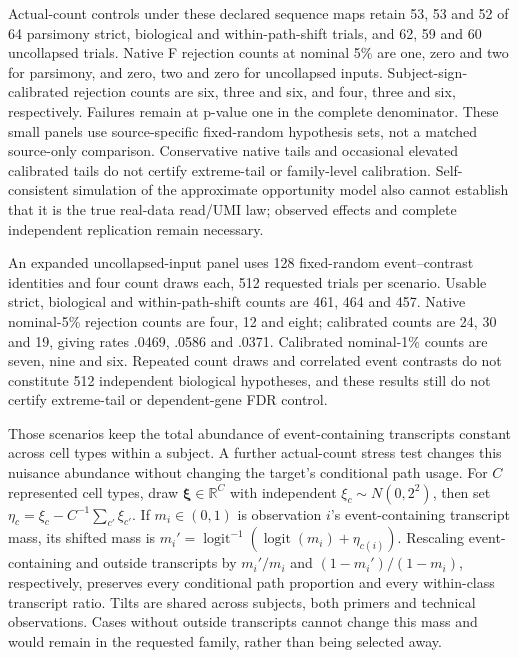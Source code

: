 \documentclass[11pt]{article}
\begin{document}
Actual-count controls under these declared sequence maps retain 53, 53 and 52 of 64 parsimony strict, biological and within-path-shift trials, and 62, 59 and 60 uncollapsed trials. Native F rejection counts at nominal 5\% are one, zero and two for parsimony, and zero, two and zero for uncollapsed inputs. Subject-sign-calibrated rejection counts are six, three and six, and four, three and six, respectively. Failures remain at p-value one in the complete denominator. These small panels use source-specific fixed-random hypothesis sets, not a matched source-only comparison. Conservative native tails and occasional elevated calibrated tails do not certify extreme-tail or family-level calibration. Self-consistent simulation of the approximate opportunity model also cannot establish that it is the true real-data read/UMI law; observed effects and complete independent replication remain necessary.

An expanded uncollapsed-input panel uses 128 fixed-random event--contrast identities and four count draws each, 512 requested trials per scenario. Usable strict, biological and within-path-shift counts are 461, 464 and 457. Native nominal-5\% rejection counts are four, 12 and eight; calibrated counts are 24, 30 and 19, giving rates .0469, .0586 and .0371. Calibrated nominal-1\% counts are seven, nine and six. Repeated count draws and correlated event contrasts do not constitute 512 independent biological hypotheses, and these results still do not certify extreme-tail or dependent-gene FDR control.

Those scenarios keep the total abundance of event-containing transcripts constant across cell types within a subject. A further actual-count stress test changes this nuisance abundance without changing the target's conditional path usage. For \(C\) represented cell types, draw \(\boldsymbol\xi\in\mathbb R^C\) with independent \(\xi_c\sim N(0,2^2)\), then set \(\eta_c=\xi_c-C^{-1}\sum_{c'}\xi_{c'}\). If \(m_i\in(0,1)\) is observation \(i\)'s event-containing transcript mass, its shifted mass is \(m_i'=\operatorname{logit}^{-1}(\operatorname{logit}(m_i)+\eta_{c(i)})\). Rescaling event-containing and outside transcripts by \(m_i'/m_i\) and \((1-m_i')/(1-m_i)\), respectively, preserves every conditional path proportion and every within-class transcript ratio. Tilts are shared across subjects, both primers and technical observations. Cases without outside transcripts cannot change this mass and would remain in the requested family, rather than being selected away.
\end{document}
